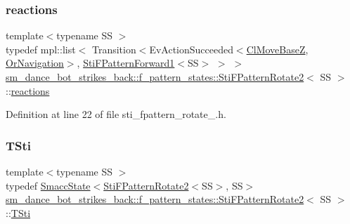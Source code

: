\subsubsection{\texorpdfstring{reactions}{reactions}}
{\footnotesize\ttfamily template$<$typename SS $>$ \\
typedef mpl\+::list$<$ Transition$<$Ev\+Action\+Succeeded$<$\hyperlink{classcl__move__base__z_1_1ClMoveBaseZ}{Cl\+Move\+BaseZ}, \hyperlink{classsm__dance__bot__strikes__back_1_1OrNavigation}{Or\+Navigation}$>$, \hyperlink{structsm__dance__bot__strikes__back_1_1f__pattern__states_1_1StiFPatternForward1}{Sti\+F\+Pattern\+Forward1}$<$SS$>$ $>$ $>$ \hyperlink{structsm__dance__bot__strikes__back_1_1f__pattern__states_1_1StiFPatternRotate2}{sm\+\_\+dance\+\_\+bot\+\_\+strikes\+\_\+back\+::f\+\_\+pattern\+\_\+states\+::\+Sti\+F\+Pattern\+Rotate2}$<$ SS $>$\+::\hyperlink{structsm__dance__bot__strikes__back_1_1f__pattern__states_1_1StiFPatternRotate2_acbf56310baa77fbcd80a7648ace4879e}{reactions}}



Definition at line 22 of file sti\+\_\+fpattern\+\_\+rotate\+\_.\+h.

\mbox{\label{structsm__dance__bot__strikes__back_1_1f__pattern__states_1_1StiFPatternRotate2_aed3f2c5cc7b21876329a8767f46d14a3}} 
\subsubsection{\texorpdfstring{T\+Sti}{TSti}}
{\footnotesize\ttfamily template$<$typename SS $>$ \\
typedef \hyperlink{classSmaccState}{Smacc\+State}$<$\hyperlink{structsm__dance__bot__strikes__back_1_1f__pattern__states_1_1StiFPatternRotate2}{Sti\+F\+Pattern\+Rotate2}$<$SS$>$, SS$>$ \hyperlink{structsm__dance__bot__strikes__back_1_1f__pattern__states_1_1StiFPatternRotate2}{sm\+\_\+dance\+\_\+bot\+\_\+strikes\+\_\+back\+::f\+\_\+pattern\+\_\+states\+::\+Sti\+F\+Pattern\+Rotate2}$<$ SS $>$\+::\hyperlink{structsm__dance__bot__strikes__back_1_1f__pattern__states_1_1StiFPatternRotate2_aed3f2c5cc7b21876329a8767f46d14a3}{T\+Sti}}



